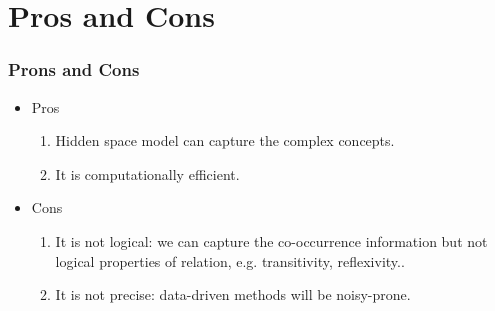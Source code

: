 \documentclass[pdf,10pt]{beamer}
\begin{document}
\section{Pros and Cons}
\begin{frame}
\frametitle{Prons and Cons}
\begin{itemize}
	\item Pros
		\begin{enumerate}
			\item Hidden space model can capture the complex concepts.
			\item It is computationally efficient.
		\end{enumerate}
	\item Cons
		\begin{enumerate}
			\item It is not logical: we can capture the co-occurrence information but not logical properties of relation, e.g. transitivity, reflexivity..
			\item It is not precise: data-driven methods will be noisy-prone.
		\end{enumerate}
\end{itemize}
\end{frame}



\end{document}
